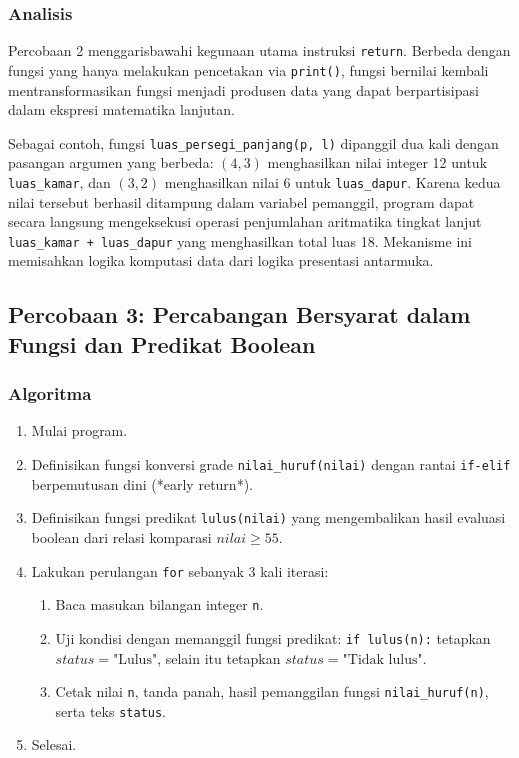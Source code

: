 \documentclass[12pt,a4paper]{article}
\begin{document}
\subsubsection{Analisis}
Percobaan 2 menggarisbawahi kegunaan utama instruksi \texttt{return}. Berbeda dengan fungsi yang hanya melakukan pencetakan via \texttt{print()}, fungsi bernilai kembali mentransformasikan fungsi menjadi produsen data yang dapat berpartisipasi dalam ekspresi matematika lanjutan.

Sebagai contoh, fungsi \texttt{luas\_persegi\_panjang(p, l)} dipanggil dua kali dengan pasangan argumen yang berbeda: $(4, 3)$ menghasilkan nilai integer 12 untuk \texttt{luas\_kamar}, dan $(3, 2)$ menghasilkan nilai 6 untuk \texttt{luas\_dapur}. Karena kedua nilai tersebut berhasil ditampung dalam variabel pemanggil, program dapat secara langsung mengeksekusi operasi penjumlahan aritmatika tingkat lanjut \texttt{luas\_kamar + luas\_dapur} yang menghasilkan total luas 18. Mekanisme ini memisahkan logika komputasi data dari logika presentasi antarmuka.

\subsection{Percobaan 3: Percabangan Bersyarat dalam Fungsi dan Predikat Boolean}
\subsubsection{Algoritma}
\begin{enumerate}
    \item Mulai program.
    \item Definisikan fungsi konversi grade \texttt{nilai\_huruf(nilai)} dengan rantai \texttt{if-elif} berpemutusan dini (*early return*).
    \item Definisikan fungsi predikat \texttt{lulus(nilai)} yang mengembalikan hasil evaluasi boolean dari relasi komparasi $nilai \ge 55$.
    \item Lakukan perulangan \texttt{for} sebanyak 3 kali iterasi:
    \begin{enumerate}[label=\alph*.]
        \item Baca masukan bilangan integer \texttt{n}.
        \item Uji kondisi dengan memanggil fungsi predikat: \texttt{if lulus(n):} tetapkan $status = \text{"Lulus"}$, selain itu tetapkan $status = \text{"Tidak lulus"}$.
        \item Cetak nilai \texttt{n}, tanda panah, hasil pemanggilan fungsi \texttt{nilai\_huruf(n)}, serta teks \texttt{status}.
    \end{enumerate}
    \item Selesai.
\end{enumerate}
\end{document}
